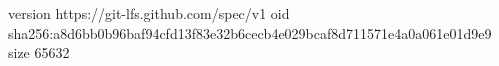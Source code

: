 version https://git-lfs.github.com/spec/v1
oid sha256:a8d6bb0b96baf94cfd13f83e32b6cecb4e029bcaf8d711571e4a0a061e01d9e9
size 65632
